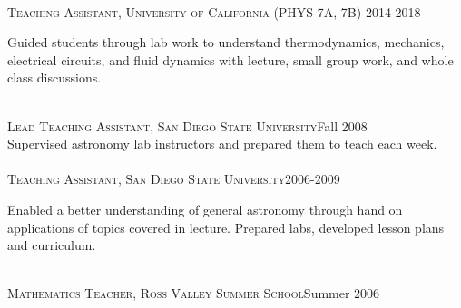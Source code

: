 \documentclass[10pt]{cv}
\begin{document}
\begin{llist}
\\
\textsc{Teaching Assistant, University of California} (PHYS 7A, 7B) \hfill 2014-2018\\
\begin{minipage}[l]{0.7\textwidth}\vspace{0.15cm}
Guided students through lab work to understand thermodynamics, mechanics, electrical circuits, and fluid dynamics with lecture, small group work, and whole class discussions.\\
\end{minipage}\vspace{0.15cm}
\\
\textsc{Lead Teaching Assistant, San Diego State University}\hfill Fall 2008\\
Supervised astronomy lab instructors and prepared them to teach each week. \\
\\
\textsc{Teaching Assistant, San Diego State University}\hfill 2006-2009\\
\begin{minipage}[l]{0.7\textwidth}\vspace{0.15cm}
Enabled a better understanding of general astronomy through hand on applications of topics covered in lecture. Prepared labs, developed lesson plans and curriculum.\\
\end{minipage}\vspace{0.15cm}
\\
\textsc{Mathematics Teacher, Ross Valley Summer School}\hfill Summer 2006\\
\begin{minipage}[l]{0.7\textwidth}\vspace{0.15cm}

\end{minipage}
\end{llist}
\end{document}
